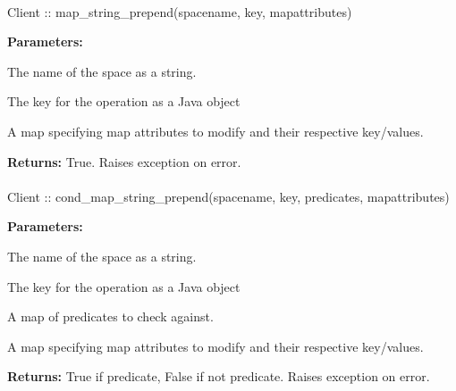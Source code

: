 \paragraph{}
\label{api:java:map_string_prepend}
\begin{javacode}
Client :: map_string_prepend(spacename, key, mapattributes)
\end{javacode}


\noindent\textbf{Parameters:}
\begin{description}[labelindent=\widthof{{\code{mapattributes}}},leftmargin=*,noitemsep,nolistsep,align=right]
\item[\code{spacename}] The name of the space as a string.
\item[\code{key}] The key for the operation as a Java object
\item[\code{mapattributes}] A map specifying map attributes to modify and their respective key/values.
\end{description}

\noindent\textbf{Returns:}
True.  Raises exception on error.

\paragraph{}
\label{api:java:cond_map_string_prepend}
\begin{javacode}
Client :: cond_map_string_prepend(spacename, key, predicates, mapattributes)
\end{javacode}


\noindent\textbf{Parameters:}
\begin{description}[labelindent=\widthof{{\code{mapattributes}}},leftmargin=*,noitemsep,nolistsep,align=right]
\item[\code{spacename}] The name of the space as a string.
\item[\code{key}] The key for the operation as a Java object
\item[\code{predicates}] A map of predicates to check against.
\item[\code{mapattributes}] A map specifying map attributes to modify and their respective key/values.
\end{description}

\noindent\textbf{Returns:}
True if predicate, False if not predicate.  Raises exception on error.

